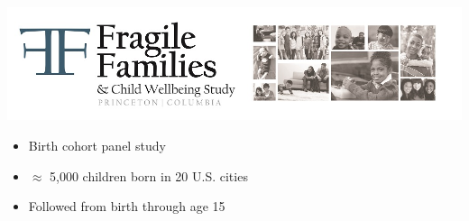 \documentclass{beamer}
\begin{document}
\begin{frame}

\begin{center}
\includegraphics[width=\textwidth]{figures/ff_logo}
\end{center}

\begin{itemize}
\item Birth cohort panel study
\item $\approx$ 5,000 children born in 20 U.S. cities
\item Followed from birth through age 15
\end{itemize}

\end{frame}
\begin{frame}

\begin{center}
\end{center}

\end{frame}

\end{document}
